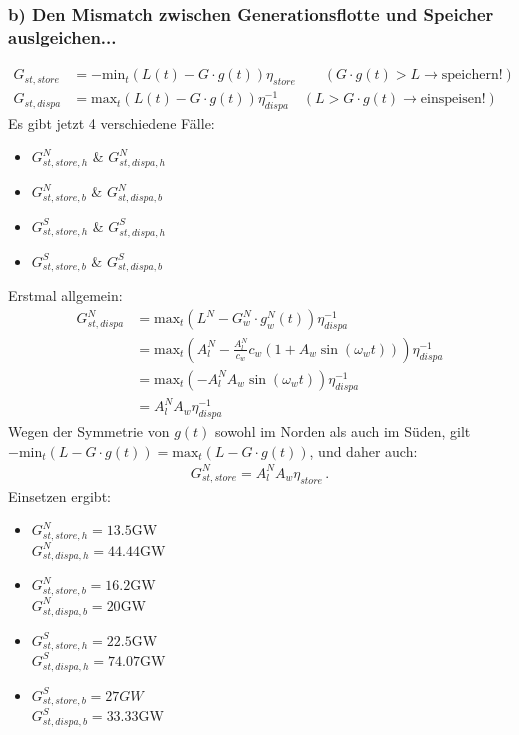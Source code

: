\documentclass[12pt]{article}
\begin{document}
\subsubsection*{b) Den Mismatch zwischen Generationsflotte und Speicher auslgeichen...}
\begin{align*}
	G_{st,store} &= - \mathrm{min}_t \left( L(t)-G\cdot g(t) \right) \eta_{store} \qquad \left(G\cdot g(t) > L \rightarrow \mathrm{speichern!}\right)\\
	G_{st,dispa} &= \mathrm{max}_t \left( L(t) - G\cdot g(t) \right) \eta_{dispa}^{-1} \quad (L > G\cdot g(t) \rightarrow \mathrm{einspeisen!})
\end{align*}
Es gibt jetzt 4 verschiedene Fälle:
\begin{itemize}
	\item $G_{st,store,h}^N$ \& $G_{st,dispa,h}^N$
	\item $G_{st,store,b}^N$ \& $G_{st,dispa,b}^N$
	\item $G_{st,store,h}^S$ \& $G_{st,dispa,h}^S$
	\item $G_{st,store,b}^S$ \& $G_{st,dispa,b}^S$
\end{itemize}
Erstmal allgemein:
\begin{align*}
	G_{st,dispa}^N &= \mathrm{max}_t \left(L^N-G^N_w\cdot g_w^N(t)\right)\eta_{dispa}^{-1} \\
	&= \mathrm{max}_t \left( A_l^N - \frac{A_l^N}{c_w}c_w\left(1+A_w\sin\left(\omega_wt\right)\right) \right) \eta_{dispa}^{-1} \\
	&= \mathrm{max}_t \left(-A_l^N A_w\sin\left(\omega_wt\right)\right) \eta_{dispa}^{-1} \\
	&= A_l^N A_w \eta_{dispa}^{-1}
\end{align*}
Wegen der Symmetrie von $g(t)$ sowohl im Norden als auch im S\"uden, gilt $-\mathrm{min}_t\left(L-G\cdot g(t)\right) = \mathrm{max}_t \left(L-G\cdot g(t)\right)$, und daher auch:
\begin{align*}
	G_{st,store}^N = A_l^NA_w\eta_{store}\,.
\end{align*}
Einsetzen ergibt:
\begin{itemize}
	\item $G_{st,store,h}^N = 13.5$GW \\ $G_{st,dispa,h}^N = 44.44$GW
	\item $G_{st,store,b}^N = 16.2$GW \\ $G_{st,dispa,b}^N = 20$GW
	\item $G_{st,store,h}^S=22.5$GW \\ $G_{st,dispa,h}^S = 74.07$GW
	\item $G_{st,store,b}^S = 27GW$ \\ $G_{st,dispa,b}^S = 33.33$GW
\end{itemize}
\end{document}
